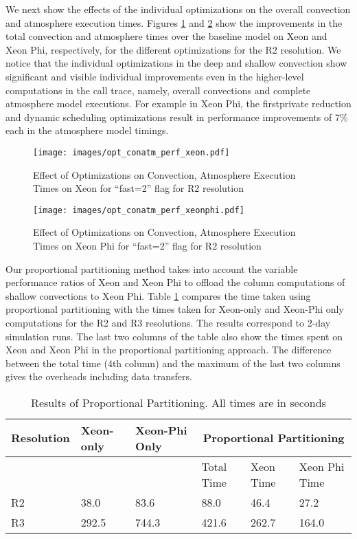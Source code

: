 We next show the effects of the individual optimizations on the overall convection and atmosphere execution times.  Figures \ref{opt_conatmcesm_perf_xeon} and \ref{opt_conatmcesm_perf_xeonphi} show the improvements in the total convection and atmosphere times over the baseline model on Xeon and Xeon Phi, respectively, for the different optimizations for the R2 resolution. We notice that the individual optimizations in the deep and shallow convection show significant and visible individual improvements even in the higher-level computations in the call trace, namely, overall convections and complete atmosphere model executions.  For example in Xeon Phi, the firstprivate reduction and dynamic scheduling optimizations result in performance improvements of 7\% each in the atmosphere model timings.

\begin {figure}
\centering
\texttt{[image: images/opt\_conatm\_perf\_xeon.pdf]}
\caption{Effect of Optimizations on Convection, Atmosphere Execution Times on Xeon for ``fast=2'' flag for R2 resolution}
\label{opt_conatmcesm_perf_xeon}
\end{figure}

\begin {figure}
\centering
\texttt{[image: images/opt\_conatm\_perf\_xeonphi.pdf]}
\caption{Effect of Optimizations on Convection, Atmosphere Execution Times on Xeon Phi for ``fast=2'' flag for R2 resolution}
\label{opt_conatmcesm_perf_xeonphi}
\end{figure}

Our proportional partitioning method takes into account the variable performance ratios of Xeon and Xeon Phi to offload the column computations of shallow convections to Xeon Phi. Table \ref{pp_results} compares the time taken using proportional partitioning with the times taken for Xeon-only and Xeon-Phi only computations for the R2 and R3 resolutions. The results correspond to 2-day simulation runs. The last two columns of the table also show the times spent on Xeon and Xeon Phi in the proportional partitioning approach. The difference between the total time (4th column) and the maximum of the last two columns gives the overheads including data transfers.

\begin{table}
\centering
\begin{tabular}{|p{0.4in}|p{0.43in}|p{0.65in}|p{0.43in}|p{0.45in}|p{0.6in}|}
\hline\hline
{\bf Resolution} & {\bf Xeon-only} & {\bf Xeon-Phi Only} & \multicolumn{3}{|c|}{{\bf Proportional Partitioning}} \\
\hline
 & & & Total Time & Xeon Time & Xeon Phi Time \\
\hline\hline
R2 & 38.0 & 83.6 & 88.0 & 46.4 & 27.2 \\
\hline
R3 & 292.5 & 744.3 & 421.6 & 262.7 & 164.0 \\
\hline\hline
\end{tabular}
\caption{Results of Proportional Partitioning. All times are in seconds}
\label{pp_results}
\end{table}

